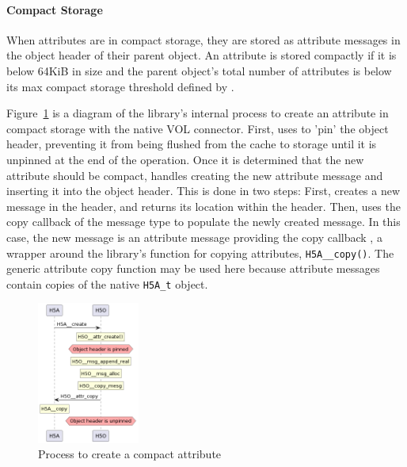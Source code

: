 \paragraph{Compact Storage} When attributes are in compact storage, they are stored as attribute messages in the object header of their parent object. An attribute is stored compactly if it is below 64KiB in size and the parent object's total number of attributes is below its max compact storage threshold defined by .

Figure~\ref{fig:tour-3-uml-attr-create-compact} is a diagram of the library's internal process to create an attribute in compact storage with the native VOL connector. First,  uses  to 'pin' the object header, preventing it from being flushed from the cache to storage until it is unpinned at the end of the operation. Once it is determined that the new attribute should be compact,  handles creating the new attribute message and inserting it into the object header. This is done in two steps: First,  creates a new message in the header, and returns its location within the header. Then,  uses the copy callback of the message type to populate the newly created message. In this case, the new message is an attribute message providing the copy callback , a wrapper around the library's function for copying attributes, \texttt{H5A\_\_copy()}. The generic attribute copy function may be used here because attribute messages contain copies of the native \texttt{H5A\_t} object.

\begin{figure}
    \centering
    \includegraphics[width=0.30\textwidth]{images/tour_3_uml_attr_create_compact.png}
    \caption{Process to create a compact attribute}
    \label{fig:tour-3-uml-attr-create-compact}
\end{figure}


